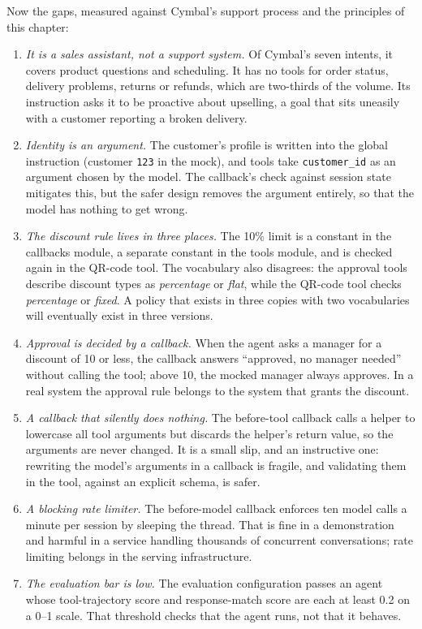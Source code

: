 Now the gaps, measured against Cymbal's support process and the principles of this chapter:
\begin{enumerate}[itemsep=2pt]
  \item \emph{It is a sales assistant, not a support system.} Of Cymbal's seven intents, it covers product questions and scheduling. It has no tools for order status, delivery problems, returns or refunds, which are two-thirds of the volume. Its instruction asks it to be proactive about upselling, a goal that sits uneasily with a customer reporting a broken delivery.
  \item \emph{Identity is an argument.} The customer's profile is written into the global instruction (customer \texttt{123} in the mock), and tools take \texttt{customer\_id} as an argument chosen by the model. The callback's check against session state mitigates this, but the safer design removes the argument entirely, so that the model has nothing to get wrong.
  \item \emph{The discount rule lives in three places.} The 10\% limit is a constant in the callbacks module, a separate constant in the tools module, and is checked again in the QR-code tool. The vocabulary also disagrees: the approval tools describe discount types as \emph{percentage} or \emph{flat}, while the QR-code tool checks \emph{percentage} or \emph{fixed}. A policy that exists in three copies with two vocabularies will eventually exist in three versions.
  \item \emph{Approval is decided by a callback.} When the agent asks a manager for a discount of 10 or less, the callback answers ``approved, no manager needed'' without calling the tool; above 10, the mocked manager always approves. In a real system the approval rule belongs to the system that grants the discount.
  \item \emph{A callback that silently does nothing.} The before-tool callback calls a helper to lowercase all tool arguments but discards the helper's return value, so the arguments are never changed. It is a small slip, and an instructive one: rewriting the model's arguments in a callback is fragile, and validating them in the tool, against an explicit schema, is safer.
  \item \emph{A blocking rate limiter.} The before-model callback enforces ten model calls a minute per session by sleeping the thread. That is fine in a demonstration and harmful in a service handling thousands of concurrent conversations; rate limiting belongs in the serving infrastructure.
  \item \emph{The evaluation bar is low.} The evaluation configuration passes an agent whose tool-trajectory score and response-match score are each at least 0.2 on a 0--1 scale. That threshold checks that the agent runs, not that it behaves.
\end{enumerate}

